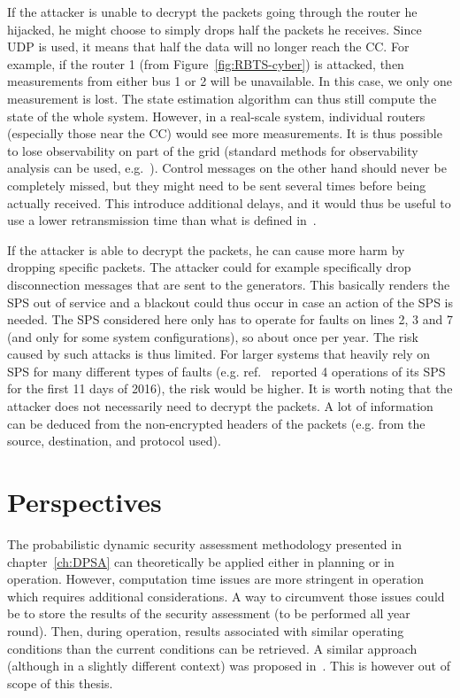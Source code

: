 If the attacker is unable to decrypt the packets going through the router he hijacked, he might choose to simply drops half the packets he receives. Since UDP is used, it means that half the data will no longer reach the CC. For example, if the router 1 (from Figure~\ref{fig:RBTS-cyber}) is attacked, then measurements from either bus 1 or 2 will be unavailable. In this case, we only one measurement is lost. The state estimation algorithm can thus still compute the state of the whole system. However, in a real-scale system, individual routers (especially those near the CC) would see more measurements. It is thus possible to lose observability on part of the grid (standard methods for observability analysis can be used, e.g.~\cite{SEbook}). Control messages on the other hand should never be completely missed, but they might need to be sent several times before being actually received. This introduce additional delays, and it would thus be useful to use a lower retransmission time than what is defined in~\cite{roundTripTime}.

If the attacker is able to decrypt the packets, he can cause more harm by dropping specific packets. The attacker could for example specifically drop disconnection messages that are sent to the generators. This basically renders the SPS out of service and a blackout could thus occur in case an action of the SPS is needed. The SPS considered here only has to operate for faults on lines 2, 3 and 7 (and only for some system configurations), so about once per year. The risk caused by such attacks is thus limited. For larger systems that heavily rely on SPS for many different types of faults (e.g. ref.~\cite{GeorgiaSPS} reported 4 operations of its SPS for the first 11 days of 2016), the risk would be higher. It is worth noting that the attacker does not necessarily need to decrypt the packets. A lot of information can be deduced from the non-encrypted headers of the packets (e.g. from the source, destination, and protocol used).

\section{Perspectives}
\label{sec:SPSperspectives}

The probabilistic dynamic security assessment methodology presented in chapter~\ref{ch:DPSA} can theoretically be applied either in planning or in operation. However, computation time issues are more stringent in operation which requires additional considerations. A way to circumvent those issues could be to store the results of the security assessment (to be performed all year round). Then, during operation, results associated with similar operating conditions than the current conditions can be retrieved. A similar approach (although in a slightly different context) was proposed in~\cite{QimingChenThesis}. This is however out of scope of this thesis.


